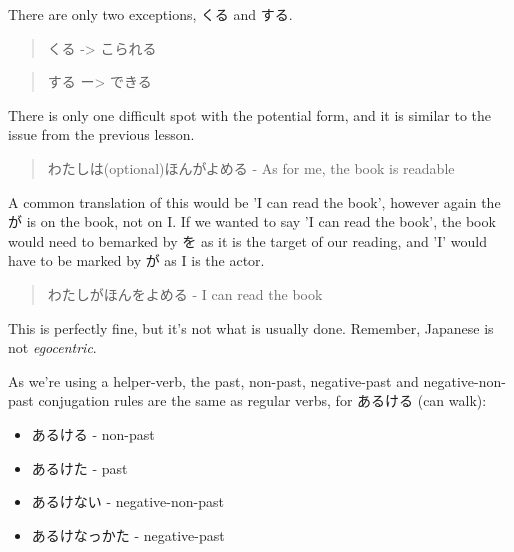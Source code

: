 \documentclass[11pt]{article}
\begin{document}
There are only two exceptions, くる and する.
\begin{quote}
くる -> こられる
\end{quote}
\begin{quote}
する ー> できる
\end{quote}

There is only one difficult spot with the potential form, and it is similar to the issue from the previous lesson.
\begin{quote}
わたしは(optional)ほんがよめる - As for me, the book is readable
\end{quote}
A common translation of this would be 'I can read the book', however again the が is on the book, not on I. If we wanted to say 'I can read the book', the book would need to bemarked by を as it is the target of our reading, and 'I' would have to be marked by が as I is the actor.
\begin{quote}
わたしがほんをよめる - I can read the book
\end{quote}
This is perfectly fine, but it's not what is usually done. Remember, Japanese is not \emph{egocentric}.

As we're using a helper-verb, the past, non-past, negative-past and negative-non-past conjugation rules are the same as regular verbs, for あるける (can walk):
\begin{itemize}
\item あるける - non-past
\item あるけた - past
\item あるけない - negative-non-past
\item あるけなっかた - negative-past
\end{itemize}
\end{document}
